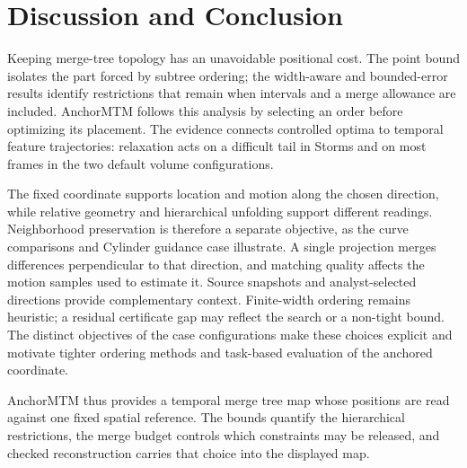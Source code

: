 \section{Discussion and Conclusion}\label{sec:discussion}
Keeping merge-tree topology has an unavoidable positional cost. The point bound isolates the part forced by subtree ordering; the width-aware and bounded-error results identify restrictions that remain when intervals and a merge allowance are included. AnchorMTM follows this analysis by selecting an order before optimizing its placement. The evidence connects controlled optima to temporal feature trajectories: relaxation acts on a difficult tail in Storms and on most frames in the two default volume configurations.

The fixed coordinate supports location and motion along the chosen direction, while relative geometry and hierarchical unfolding support different readings. Neighborhood preservation is therefore a separate objective, as the curve comparisons and Cylinder guidance case illustrate. A single projection merges differences perpendicular to that direction, and matching quality affects the motion samples used to estimate it. Source snapshots and analyst-selected directions provide complementary context. Finite-width ordering remains heuristic; a residual certificate gap may reflect the search or a non-tight bound. The distinct objectives of the case configurations make these choices explicit and motivate tighter ordering methods and task-based evaluation of the anchored coordinate.

AnchorMTM thus provides a temporal merge tree map whose positions are read against one fixed spatial reference. The bounds quantify the hierarchical restrictions, the merge budget controls which constraints may be released, and checked reconstruction carries that choice into the displayed map.
